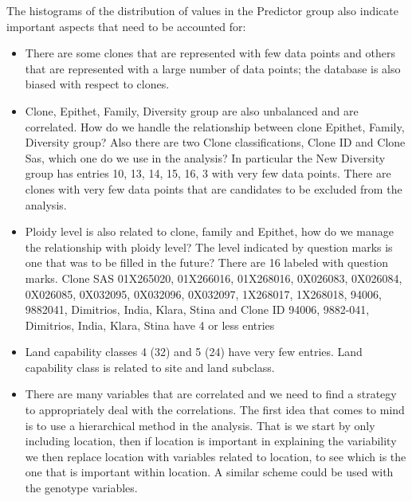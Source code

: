 \documentclass{article}\usepackage[]{graphicx}\usepackage[]{color}
\begin{document}
The histograms of the distribution of values in the Predictor group also indicate important aspects that need to be accounted for:
  
\begin{itemize}

  \item
  There are some clones that are represented with few data points and others that are represented with a large number of data points; the database is also biased with respect to clones.
  
  \item
  Clone, Epithet, Family, Diversity group are also unbalanced and are correlated. How do we handle the relationship between clone Epithet, Family, Diversity group? Also there are two Clone classifications, Clone ID and Clone Sas, which one do we use in the analysis? In particular the New Diversity group has entries 10, 13, 14, 15, 16, 3 with very few data points. There are clones with very few data points that are candidates to be excluded from the analysis.
  
  \item
  Ploidy level is also related to clone, family and Epithet, how do we manage the relationship with ploidy level? The level indicated by  question marks is one that was to be filled in the future? There are 
  16 
  labeled with question marks.
  Clone SAS 
  01X265020, 01X266016, 01X268016, 0X026083, 0X026084, 0X026085, 0X032095, 0X032096, 0X032097, 1X268017, 1X268018, 94006, 9882041, Dimitrios, India, Klara, Stina
  and Clone ID 
  94006, 9882-041, Dimitrios, India, Klara, Stina
   have 4 or less entries
  
  \item
  Land capability classes 4 (32) and 5 (24) have very few entries. Land capability class is related to site and land subclass.
          
  
  \item
  There are many variables that are correlated and we need to find a strategy to appropriately deal with the correlations. The first idea that comes to mind is to use a hierarchical method in the analysis. That is we start by only including location, then if location is important in explaining the variability we then replace location with variables related to location, to see which is the one that is important within location. A similar scheme could be used with the genotype variables.
  
  
\end{itemize} 
\end{document}
